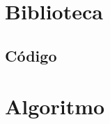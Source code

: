 \documentclass[
	12pt,				%
	openright,			%
	oneside,			%
	a4paper,			%
	english,			%
	french,				%
	spanish,			%
	brazil				%
	]{abntex2}
\begin{document}
\begin{anexosenv}
\chapter{Biblioteca}
\section{Código}

\chapter{Algoritmo}
\end{anexosenv}
\printindex
\end{document}
